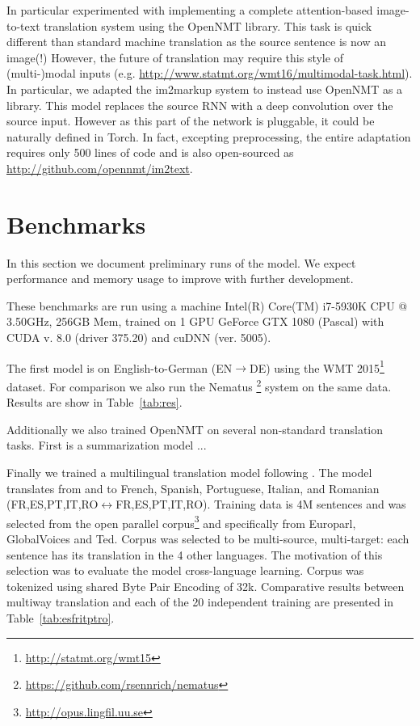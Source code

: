 \documentclass[11pt]{article}
\begin{document}
In particular experimented with implementing a complete
attention-based image-to-text translation system
\cite{DBLP:journals/corr/XuBKCCSZB15} using the OpenNMT library. This
task is quick different than standard machine translation as the
source sentence is now an image(!)  However, the future of translation
may require this style of (multi-)modal inputs
(e.g. \url{http://www.statmt.org/wmt16/multimodal-task.html}). In
particular, we adapted the im2markup system
\cite{DBLP:journals/corr/DengKR16} to instead use OpenNMT as a
library.  This model replaces the source RNN with a deep convolution
over the source input. However as this part of the network is
pluggable, it could be naturally defined in Torch. In fact, excepting
preprocessing, the entire adaptation requires only 500 lines of code
and is also open-sourced as \url{http://github.com/opennmt/im2text}.

\section{Benchmarks}


In this section we document preliminary runs of the model. We expect
performance and memory usage to improve with further development.

These benchmarks are run using a machine Intel(R) Core(TM) i7-5930K CPU @ 3.50GHz, 256GB Mem, trained on 1 GPU GeForce GTX 1080 (Pascal) with
CUDA v. 8.0 (driver 375.20) and cuDNN (ver. 5005). 

The first model is on English-to-German (EN$\rightarrow$DE) using the WMT 2015\footnote{\url{http://statmt.org/wmt15}}
dataset. For comparison we also run the Nematus \footnote{\url{https://github.com/rsennrich/nematus}} system on 
the same data. Results are show in Table~\ref{tab:res}. 

Additionally we also trained OpenNMT on several non-standard
translation tasks. First is a summarization model \cite{} ...

Finally we trained a multilingual translation model following . The model translates from and to 
French, Spanish, Portuguese, Italian, and Romanian (FR,ES,PT,IT,RO$\leftrightarrow$FR,ES,PT,IT,RO). Training data is 4M sentences and was selected from the open parallel corpus\footnote{\url{http://opus.lingfil.uu.se}} and specifically from Europarl, GlobalVoices and Ted. Corpus was selected to be multi-source, multi-target: each sentence has its translation in the 4 other languages. The motivation of this selection was to evaluate the model cross-language learning. Corpus was tokenized using shared Byte Pair Encoding of 32k.
Comparative results between multiway translation and each of the 20 independent training are presented in Table~\ref{tab:esfritptro}.
\end{document}
